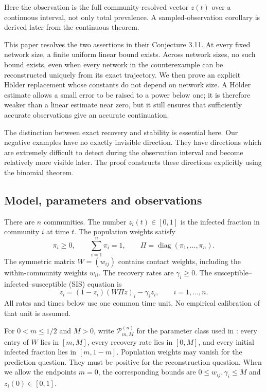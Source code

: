 Here the observation is the full community-resolved vector $z(t)$ over a
continuous interval, not only total prevalence. A sampled-observation
corollary is derived later from the continuous theorem.

This paper resolves the two assertions in their Conjecture 3.11. At every fixed network size, a finite uniform linear bound exists. Across network sizes, no such bound exists, even when every network in the counterexample can be reconstructed uniquely from its exact trajectory. We then prove an explicit Hölder replacement whose constants do not depend on network size. A Hölder estimate allows a small error to be raised to a power below one; it is therefore weaker than a linear estimate near zero, but it still ensures that sufficiently accurate observations give an accurate continuation.

The distinction between exact recovery and stability is essential here. Our negative examples have no exactly invisible direction. They have directions which are extremely difficult to detect during the observation interval and become relatively more visible later. The proof constructs these directions explicitly using the binomial theorem.

\subsection{Model, parameters and observations}

There are $n$ communities. The number $z_i(t)\in[0,1]$ is the infected fraction in community $i$ at time $t$. The population weights satisfy
\[
 \pi_i\geq0,\qquad \sum_{i=1}^n\pi_i=1,
 \qquad \Pi=\operatorname{diag}(\pi_1,\ldots,\pi_n).
\]
The symmetric matrix $W=(w_{ij})$ contains contact weights, including the within-community weights $w_{ii}$. The recovery rates are $\gamma_i\geq0$. The susceptible--infected--susceptible (SIS) equation is
\begin{equation}
 \dot z_i=(1-z_i)(W\Pi z)_i-\gamma_i z_i,
 \qquad i=1,\ldots,n.
 \label{eq:sis}
\end{equation}
All rates and times below use one common time unit. No empirical calibration of that unit is assumed.

For $0<m\leq1/2$ and $M>0$, write $\mathcal P_{m,M}^{(n)}$ for the parameter class used in \cite{KH2026}: every entry of $W$ lies in $[m,M]$, every recovery rate lies in $[0,M]$, and every initial infected fraction lies in $[m,1-m]$. Population weights may vanish for the prediction question. They must be positive for the reconstruction question. When we allow the endpoints $m=0$, the corresponding bounds are $0\leq w_{ij},\gamma_i\leq M$ and $z_i(0)\in[0,1]$.

